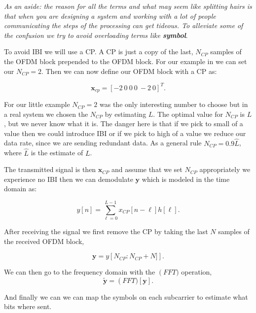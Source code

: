 \emph{As an aside: the reason for all the terms and what may seem like splitting hairs is that when you are designing a system and working with a lot of people communicating the steps of the processing can get tideous. To alleviate some of the confusion we try to avoid overloading terms like \bf{symbol}}.

To avoid \ac{IBI} we will use a \ac{CP}. A \ac{CP} is just a copy of the last, $N_{CP}$ samples of the \ac{OFDM} block prepended to the \ac{OFDM} block. For our example in  we can set our $N_{CP}=2$. Then we can now define our \ac{OFDM} block with a \ac{CP} as:

\begin{equation}
\mathbf{x}_{cp}= [-2~0~0~0~-2~0]^T.
\end{equation}

For our little example $N_{CP}=2$ was the only interesting number to choose but in a real system we chosen the $N_{CP}$ by estimating $L$. The optimal value for $N_{CP}$ is $L$, but we never know what it is. The danger here is that if we pick to small of a value then we could introduce \ac{IBI} or if we pick to high of a value we reduce our data rate, since we are sending redundant data. As a general rule $N_{CP}=0.9\hat{L}$, where $\hat{L}$ is the estimate of $L$.

The transmitted signal is then $\mathbf{x}_{CP}$ and assume that we set $N_{CP}$ appropriately we experience no \ac{IBI} then we can demodulate $\mathbf{y}$ which is modeled in the time domain as:

\begin{equation}
y[n] = \sum_{\ell=0}^{L-1}x_{CP}[n-\ell]h[\ell].
\end{equation}
\noindent

After receiving the signal we first remove the \ac{CP} by taking the last $N$ samples of the received \ac{OFDM} block,

\begin{equation}
\mathbf{y} = y\left[N_{CP}:N_{CP}+N]\right].
\end{equation}
\noindent

We can then go to the frequency domain with the $\operatorname(FFT)$ operation,
\begin{equation}
\label{eq:rxfft}
\tilde{\mathbf{y}} = \operatorname(FFT)\left[\mathbf{y}\right].
\end{equation}
\noindent

And finally we can we can map the symbols on each subcarrier to estimate what bits where sent.

